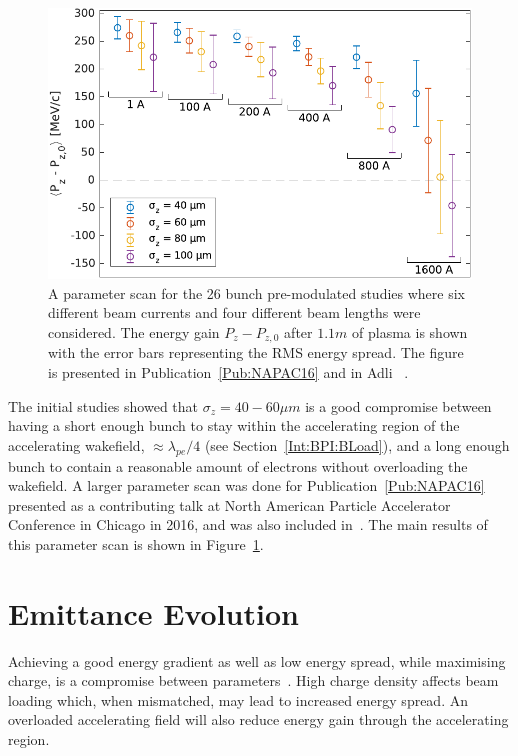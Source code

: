 \begin{figure}[hbt]
    \centering
    \includegraphics[width=0.625\linewidth]{figures/NAPACEGainSpreadScan}
    \caption{\label{Fig:SimA:BLoadScan}
        A parameter scan for the 26 bunch pre-modulated studies where six different beam currents and four different beam lengths were considered.
        The energy gain $P_{z} - P_{z,0}$ after $1.1\unit{m}$ of plasma is shown with the error bars representing the RMS energy spread.
        The figure is presented in Publication~\ref{Pub:NAPAC16} and in Adli \etal~\cite{adli:2016a}.
    }
\end{figure}

The initial studies showed that $\sigma_{z} = 40-60\unit{\mu m}$ is a good compromise between having a short enough bunch to stay within the accelerating region of the accelerating wakefield, $\approx \lambda_{pe}/4$ (see Section~\ref{Int:BPI:BLoad}), and a long enough bunch to contain a reasonable amount of electrons without overloading the wakefield.
A larger parameter scan was done for Publication~\ref{Pub:NAPAC16} presented as a contributing talk at North American Particle Accelerator Conference in Chicago in 2016, and was also included in~\cite{adli:2016a}.
The main results of this parameter scan is shown in Figure~\ref{Fig:SimA:BLoadScan}.

\section{Emittance Evolution}
\label{SimA:Emitt}

Achieving a good energy gradient as well as low energy spread, while maximising charge, is a compromise between parameters~\cite{berglyd_olsen:2018}.
High charge density affects beam loading which, when mismatched, may lead to increased energy spread.
An overloaded accelerating field will also reduce energy gain through the accelerating region.

